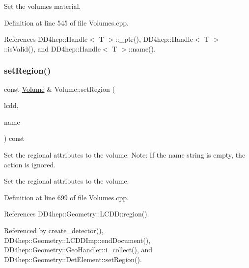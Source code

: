 Set the volume\textquotesingle{}s material. 



Definition at line 545 of file Volumes.\+cpp.



References D\+D4hep\+::\+Handle$<$ T $>$\+::\+\_\+ptr(), D\+D4hep\+::\+Handle$<$ T $>$\+::is\+Valid(), and D\+D4hep\+::\+Handle$<$ T $>$\+::name().

\hypertarget{class_d_d4hep_1_1_geometry_1_1_volume_a53f47176e37d1828ff96af28fdf006fe}{}\label{class_d_d4hep_1_1_geometry_1_1_volume_a53f47176e37d1828ff96af28fdf006fe} 
\subsubsection{\texorpdfstring{set\+Region()}{setRegion()}\hspace{0.1cm}{\footnotesize\ttfamily [1/2]}}
{\footnotesize\ttfamily const \hyperlink{class_d_d4hep_1_1_geometry_1_1_volume}{Volume} \& Volume\+::set\+Region (\begin{DoxyParamCaption}\item[{const \hyperlink{class_d_d4hep_1_1_geometry_1_1_l_c_d_d}{L\+C\+DD} \&}]{lcdd,  }\item[{const std\+::string \&}]{name }\end{DoxyParamCaption}) const}



Set the regional attributes to the volume. Note\+: If the name string is empty, the action is ignored. 

Set the regional attributes to the volume. 

Definition at line 699 of file Volumes.\+cpp.



References D\+D4hep\+::\+Geometry\+::\+L\+C\+D\+D\+::region().



Referenced by create\+\_\+detector(), D\+D4hep\+::\+Geometry\+::\+L\+C\+D\+D\+Imp\+::end\+Document(), D\+D4hep\+::\+Geometry\+::\+Geo\+Handler\+::i\+\_\+collect(), and D\+D4hep\+::\+Geometry\+::\+Det\+Element\+::set\+Region().

\hypertarget{class_d_d4hep_1_1_geometry_1_1_volume_a8b969e96fd80af17255ea25b993c47bf}{}\label{class_d_d4hep_1_1_geometry_1_1_volume_a8b969e96fd80af17255ea25b993c47bf} 
